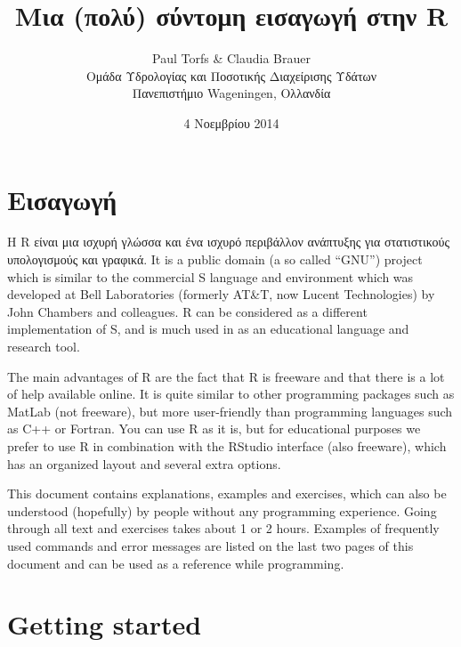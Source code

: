 \documentclass[a4paper,11pt,twocolumn,tablecaptionabove]{scrartcl}
\title{\vspace{-13mm}Μια (πολύ) σύντομη εισαγωγή στην R}
\author{Paul Torfs \& Claudia Brauer\\
\footnotesize{Ομάδα Υδρολογίας και Ποσοτικής Διαχείρισης Υδάτων}\\
\footnotesize{Πανεπιστήμιο Wageningen, Ολλανδία}}
\date{\small{4 Νοεμβρίου 2014}}
\begin{document}
\maketitle

\section{Εισαγωγή}

Η R είναι μια ισχυρή γλώσσα και ένα ισχυρό περιβάλλον ανάπτυξης για στατιστικούς
υπολογισμούς και γραφικά. It is a public domain (a so called ``GNU'') project which is
similar to the commercial  S language and environment which was
developed at Bell Laboratories (formerly AT\&T, now Lucent
Technologies) by John Chambers and colleagues. R can be considered as
a different implementation of S, and is much used in as an educational
language and research tool.

The main advantages of R are the fact that R is freeware and that there is a lot of help available online. It is quite similar to other programming packages such as MatLab (not freeware), but more user-friendly than programming languages such as C++ or Fortran. You can use R as it is, but for educational purposes we prefer to use R in combination with the RStudio interface (also freeware), 
which has an organized layout and several extra options. 

This document contains explanations, examples and exercises, which can also be understood (hopefully) by people without any programming experience. Going through all text and exercises takes about 1 or 2 hours. Examples of frequently used commands and error messages are listed on the last two pages of this document and can be used as a reference while programming.


\section{Getting started}

\end{document}
